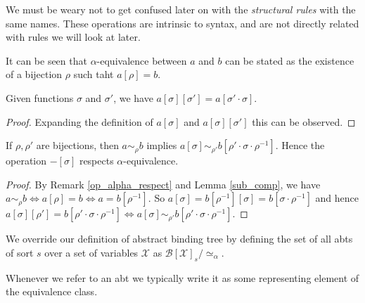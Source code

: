 \begin{remark}
    We must be weary not to get confused later on with the \emph{structural rules} with the same names. These operations are intrinsic to syntax, and are not directly related with rules we will look at later.
\end{remark}

\begin{remark}\label{op_alpha_respect}
    It can be seen that $\alpha$-equivalence between $a$ and $b$ can be stated as the existence of a bijection $\rho$ such taht $a[\rho] = b$.
\end{remark}

\begin{lemma}\label{sub_comp}
    Given functions $\sigma$ and $\sigma'$, we have $a[\sigma][\sigma'] = a[\sigma' \cdot \sigma]$.
\end{lemma}

\begin{proof}
    Expanding the definition of $a[\sigma]$ and $a[\sigma][\sigma']$ this can be observed.
\end{proof}

\begin{lemma}
    If $\rho, \rho'$ are bijections, then $a \sim_\rho b$ implies $a[\sigma] \sim_{\rho'} b[\rho ' \cdot \sigma \cdot \rho^{-1}]$. Hence the operation $-[\sigma]$ respects $\alpha$-equivalence.
\end{lemma}

\begin{proof}
    By Remark \ref{op_alpha_respect} and Lemma \ref{sub_comp}, we have $a \sim_\rho b \iff a[\rho] = b \iff a = b[\rho^{-1}]$. So $a[\sigma] = b[\rho^{-1}][\sigma]=b[\sigma \cdot \rho^{-1}]$ and hence  $a[\sigma][\rho']=b[\rho' \cdot \sigma \cdot \rho^{-1}]\iff a[\sigma] \sim_{\rho'} b[\rho' \cdot \sigma \cdot \rho^{-1}]$.
\end{proof}

%
\begin{defin}
    We override our definition of abstract binding tree by defining the set of all abts of sort $s$ over a set of variables $\mathcal{X}$ as $\mathcal{B}[\mathcal{X}]_s / \simeq_{\alpha}$.
\end{defin}

\begin{remark}
    Whenever we refer to an abt we typically write it as some representing element of the equivalence class.
\end{remark}

